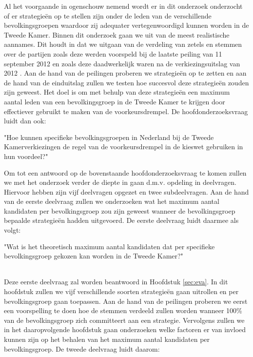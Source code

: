 Al het voorgaande in ogenschouw nemend wordt er in dit onderzoek onderzocht of er strategie\"{e}n op te stellen zijn onder de leden van de verschillende bevolkingsgroepen waardoor zij adequater vertegenwoordigd kunnen worden in de Tweede Kamer. Binnen dit onderzoek gaan we uit van de meest realistische aannames. Dit houdt in dat we uitgaan van de verdeling van zetels en stemmen over de partijen zoals deze werden voorspeld bij de laatste peiling van 11 september 2012 \citep{IPSOS} en zoals deze daadwerkelijk waren na de verkiezingsuitslag van 2012 \citep{Kiesraad_uitslag}. Aan de hand van de peilingen proberen we strategie\"{e}n op te zetten en aan de hand van de einduitslag zullen we testen hoe succesvol deze strategie\"{e}n zouden zijn geweest. Het doel is om met behulp van deze strategie\"{e}n een maximum aantal leden van een bevolkingsgroep in de Tweede Kamer te krijgen door effectiever gebruikt te maken van de voorkeursdrempel. De hoofdonderzoeksvraag luidt dan ook: \\


\begin{HOV}
\large
"Hoe kunnen specifieke bevolkingsgroepen in Nederland bij de Tweede Kamerverkiezingen de regel van de voorkeursdrempel in de kieswet gebruiken in hun voordeel?"\\
\end{HOV}

\normalsize
Om tot een antwoord op de bovenstaande hoofdonderzoeksvraag te komen zullen we met het onderzoek verder de diepte in gaan d.m.v. opdeling in deelvragen. Hiervoor hebben zijn vijf deelvragen opgezet en twee subdeelvragen. Aan de hand van de eerste deelvraag zullen we onderzoeken wat het maximum aantal kandidaten per bevolkingsgroep zou zijn geweest wanneer de bevolkingsgroep bepaalde strategie\"{e}n hadden uitgevoerd. De eerste deelvraag luidt daarmee als volgt:\\

\begin{DV}
"Wat is het theoretisch maximum aantal kandidaten dat per specifieke bevolkingsgroep gekozen kan worden in de Tweede Kamer?"\\\
\end{DV}

Deze eerste deelvraag zal worden beantwoord in Hoofdstuk \ref{sec:eva}. In dit hoofdstuk zullen we vijf verschillende soorten strategie\"{e}n gaan uitrollen en per  bevolkingsgroep gaan toepassen. Aan de hand van de peilingen proberen we eerst een voorspelling te doen hoe de stemmen verdeeld zullen worden wanneer 100\% van de bevolkingsgroep zich committeert aan een strategie. Vervolgens zullen we in het daaropvolgende hoofdstuk gaan onderzoeken welke factoren er van invloed kunnen zijn op het behalen van het maximum aantal kandidaten per bevolkingsgroep. De tweede deelvraag luidt daarom: \\

